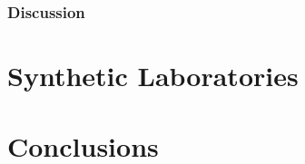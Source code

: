 \documentclass[../main.tex]{subfiles}
\begin{document}
\subsubsection{Discussion}


\section{Synthetic Laboratories}


\section{Conclusions}

\onlyinsubfile{
\newpage
\printbibliography[segment=4, heading=subbibliography]
}
\end{document}
